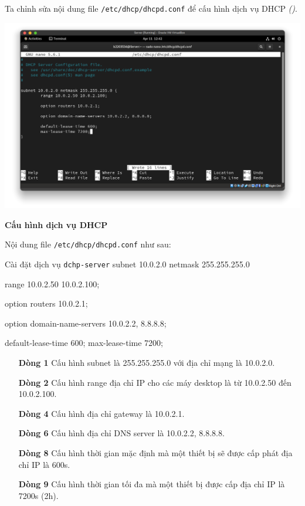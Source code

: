 Ta chỉnh sửa nội dung file \texttt{/etc/dhcp/dhcpd.conf} để cấu hình dịch vụ DHCP
\textit{()}.

\begin{minipage}{.93\linewidth}
  \captionsetup{type=figure, skip=-15pt}
  \includegraphics[width=\linewidth]{./imgs/Hinh-18.png}
  \caption{\bfseries Cấu hình dịch vụ DHCP}
  \label{fig:config-dhcp}
\end{minipage}

Nội dung file \texttt{/etc/dhcp/dhcpd.conf} như sau:

\vspace{0.5cm}
\begin{bashlisting}{Cài đặt dịch vụ \texttt{dchp-server}}
  subnet 10.0.2.0 netmask 255.255.255.0 {
      range 10.0.2.50 10.0.2.100;

      option routers 10.0.2.1;

      option domain-name-servers 10.0.2.2, 8.8.8.8;

      default-lease-time 600;
      max-lease-time 7200;
    }
\end{bashlisting}

\begin{itemize}
  \item [\textbf{Dòng 1}] Cấu hình subnet là 255.255.255.0 với địa chỉ mạng là 10.0.2.0.
  \item [\textbf{Dòng 2}] Cấu hình range địa chỉ IP cho các máy desktop là từ 10.0.2.50 đến 10.0.2.100.
  \item [\textbf{Dòng 4}] Cấu hình địa chỉ gateway là 10.0.2.1.
  \item [\textbf{Dòng 6}] Cấu hình địa chỉ DNS server là 10.0.2.2, 8.8.8.8.
  \item [\textbf{Dòng 8}] Cấu hình thời gian mặc định mà một thiết bị sẽ được cấp phát địa chỉ IP là 600s.
  \item [\textbf{Dòng 9}] Cấu hình thời gian tối đa mà một thiết bị được cấp địa chỉ IP là 7200s (2h).
\end{itemize}

